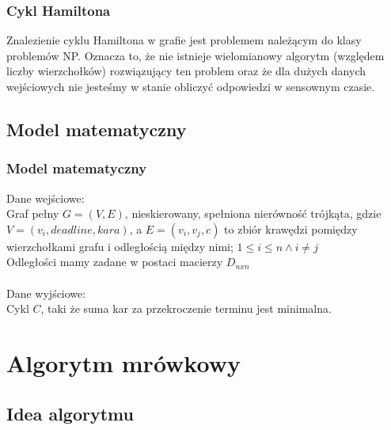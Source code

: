 \documentclass{beamer}
\begin{document}
\begin{frame}
\frametitle{Cykl Hamiltona}
Znalezienie cyklu Hamiltona w grafie jest problemem należącym do klasy problemów NP.
Oznacza to, że nie istnieje wielomianowy algorytm (względem liczby wierzchołków) rozwiązujący ten problem oraz że dla dużych danych wejściowych nie jesteśmy w stanie obliczyć odpowiedzi w sensownym czasie.

\end{frame}

\subsection{Model matematyczny}
\begin{frame}
\frametitle{Model matematyczny}
Dane wejściowe: \\
Graf pełny $G=(V,E)$, nieskierowany, spełniona nierówność trójkąta, gdzie $V = (v_i, deadline, kara) $, a $E = (v_i,v_j,c)$ to zbiór krawędzi pomiędzy wierzchołkami grafu i odległością między nimi; $1 \leq i \leq n \wedge i \neq j$  \\
Odległości mamy zadane w postaci macierzy $D_{nxn}$ \\
\iffalse Funkcja kary $ f : (E,K) \rightarrow {\rm I\!R} $ , gdzie $E$ to zbiór wierzchołków $G$, a $K$ to czasy najpóźniejszego przybycia, po którym naliczana jest kara.
\\
\fi
\hspace{1cm}\\
Dane wyjściowe: \\
Cykl $C$, taki że suma kar za przekroczenie terminu jest minimalna.
\end{frame}



\section{Algorytm mrówkowy}

\subsection{Idea algorytmu}
\end{document}
